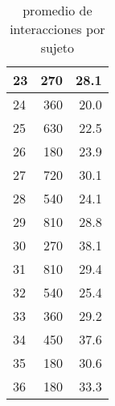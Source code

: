 \documentclass[spanish]{article}
\begin{document}
\begin{table}[h!]
\begin{center}
\begin{tabular}{|l|r|r|}
    23 &              270 &                      28.1\\ \hline
    24 &              360 &                      20.0\\ \hline
    25 &              630 &                      22.5\\ \hline
    26 &              180 &                      23.9\\ \hline
    27 &              720 &                      30.1\\ \hline
    28 &              540 &                      24.1\\ \hline
    29 &              810 &                      28.8\\ \hline
    30 &              270 &                      38.1\\ \hline
    31 &              810 &                      29.4\\ \hline
    32 &              540 &                      25.4\\ \hline
    33 &              360 &                      29.2\\ \hline
    34 &              450 &                      37.6\\ \hline
    35 &              180 &                      30.6\\ \hline
    36 &              180 &                      33.3\\ \hline
\end{tabular}
\caption{promedio de interacciones por sujeto}
\end{center}
\end{table}
\end{document}
